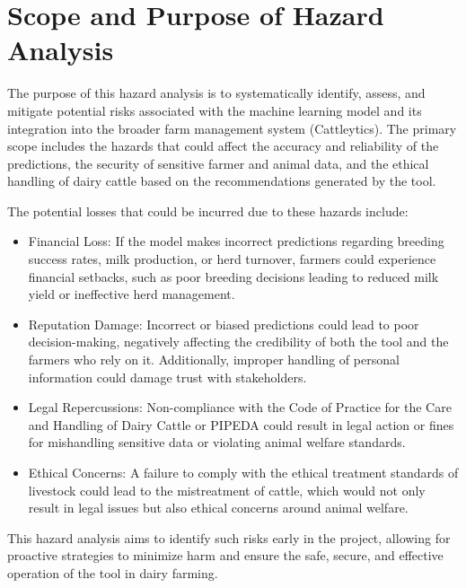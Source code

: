 \documentclass{article}
\begin{document}
\section{Scope and Purpose of Hazard Analysis}

The purpose of this hazard analysis is to systematically identify, assess, and
mitigate potential risks associated with the machine learning model and its
integration into the broader farm management system (Cattleytics). The primary
scope includes the hazards that could affect the accuracy and reliability of the
predictions, the security of sensitive farmer and animal data, and the ethical
handling of dairy cattle based on the recommendations generated by the tool.

The potential losses that could be incurred due to these hazards include:

\begin{itemize}
	\item Financial Loss: If the model makes incorrect predictions regarding
	      breeding success rates, milk production, or herd turnover, farmers
	      could experience financial setbacks, such as poor breeding decisions
	      leading to reduced milk yield or ineffective herd management.
	      
	\item Reputation Damage: Incorrect or biased predictions could lead to poor
	      decision-making, negatively affecting the credibility of both the tool
	      and the farmers who rely on it. Additionally, improper handling of
	      personal information could damage trust with stakeholders.
	      
	\item Legal Repercussions: Non-compliance with the Code of Practice for the
	      Care and Handling of Dairy Cattle or PIPEDA could result in legal
	      action or fines for mishandling sensitive data or violating animal
	      welfare standards.
	      
	\item Ethical Concerns: A failure to comply with the ethical treatment
	      standards of livestock could lead to the mistreatment of cattle, which
	      would not only result in legal issues but also ethical concerns around
	      animal welfare.
	      
\end{itemize}

This hazard analysis aims to identify such risks early in the project, allowing
for proactive strategies to minimize harm and ensure the safe, secure, and
effective operation of the tool in dairy farming.
\end{document}
